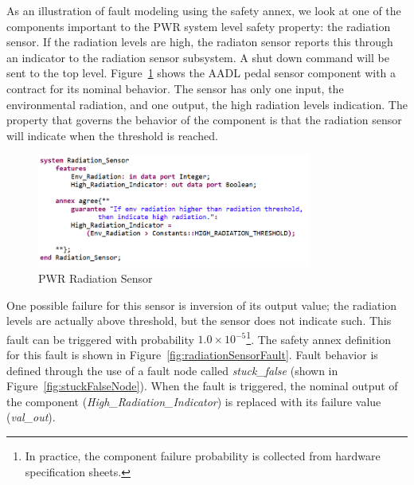 As an illustration of fault modeling using the safety annex, we look at one of the components important to the PWR system level safety property: the radiation sensor.  If the radiation levels are high, the radiaton sensor reports this through an indicator to the radiation sensor subsystem. A shut down command will be sent to the top level. Figure~\ref{fig:radiationSensor} shows the AADL pedal sensor component with a contract for its nominal behavior. The sensor has only one input, the environmental radiation, and one output, the high radiation levels indication. The property that governs the behavior of the component is that the radiation sensor will indicate when the threshold is reached.

\begin{figure}[h!]
	\begin{center}
		\includegraphics[width=0.8\textwidth]{images/radiationSensor.png}
		\caption{PWR Radiation Sensor}
		\label{fig:radiationSensor}
	\end{center}
\end{figure}

One possible failure for this sensor is inversion of its output value; the radiation levels are actually above threshold, but the sensor does not indicate such. This fault can be triggered with probability $1.0\times 10^{-5}$\footnote{In practice, the component failure probability is 
collected from hardware specification sheets.}. The safety annex definition for this fault is shown in Figure~\ref{fig:radiationSensorFault}. Fault behavior is defined through the use of a fault node called \textit{stuck\_false} (shown in Figure~\ref{fig:stuckFalseNode}).  When the fault is triggered, the nominal output of the component (\textit{High\_Radiation\_Indicator}) is replaced with its failure value (\textit{val\_out}). 

